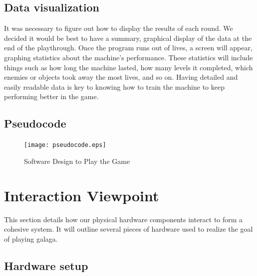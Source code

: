 \documentclass{onecolumn, draftclsnofoot,10pt, compsoc}[IEEEtran
\begin{document}
\subsection{Data visualization}%

It was necessary to figure out how to display the results of each round.
We decided it would be best to have a summary, graphical display of the data at the end of the playthrough.
Once the program runs out of lives, a screen will appear, graphing statistics about the machine's performance.
These statistics will include things such as how long the machine lasted, how many levels it completed, which enemies or objects took away the most lives, and so on.
Having detailed and easily readable data is key to knowing how to train the machine to keep performing better in the game.

\subsection{Pseudocode}
\begin{figure}
  \texttt{[image: pseudocode.eps]}
  \caption{Software Design to Play the Game}
  \label{fig:3.2}
\end{figure}

\newpage

\section{Interaction Viewpoint}\label{sssec:num1}%

This section details how our physical hardware components interact to form a cohesive system.
It will outline several pieces of hardware used to realize the goal of playing galaga.

\subsection{Hardware setup}%
\end{document}
